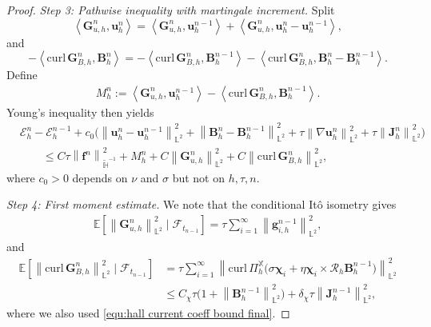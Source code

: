 \documentclass[11pt, reqno]{amsart}
\theoremstyle{definition}
\numberwithin{equation}{section}
\newcommand{\curl}{\mathrm{curl}\,}
\newcommand{\bff}{\boldsymbol}
\newcommand{\bb}{\mathbb}
\newcommand{\norm}[2]{\left\|{#1}\right\|_{#2}}
\newcommand{\inpro}[2]{\left\langle#1,#2\right\rangle}
\begin{document}
\begin{proof}
	\emph{Step 3: Pathwise inequality with martingale increment.}
	Split
	\[
	\inpro{\bff G_{u,h}^n}{\bff u_h^n}
	=
	\inpro{\bff G_{u,h}^n}{\bff u_h^{n-1}}
	+
	\inpro{\bff G_{u,h}^n}{\bff u_h^n-\bff u_h^{n-1}},
	\]
	and
	\[
	-\inpro{\curl\bff G_{B,h}^n}{\bff B_h^n}
	=
	-\inpro{\curl\bff G_{B,h}^n}{\bff B_h^{n-1}}
	-
	\inpro{\curl\bff G_{B,h}^n}{\bff B_h^n-\bff B_h^{n-1}}.
	\]
	Define
	\begin{align}\label{equ:mart increment revised}
		M_h^n
		:=
		\inpro{\bff G_{u,h}^n}{\bff u_h^{n-1}}
		-
		\inpro{\curl\bff G_{B,h}^n}{\bff B_h^{n-1}}.
	\end{align}
	Young's inequality then yields
	\begin{align}\label{equ:pathwise inequality revised}
		&\mathcal E_h^n-\mathcal E_h^{n-1}
		+
		c_0\Big(
		\norm{\bff u_h^n-\bff u_h^{n-1}}{\bb L^2}^2
		+
		\norm{\bff B_h^n-\bff B_h^{n-1}}{\bb L^2}^2
		+
		\tau\norm{\nabla\bff u_h^n}{\bb L^2}^2
		+
		\tau\norm{\bff J_h^n}{\bb L^2}^2
		\Big)
		\nonumber\\
		&\qquad
		\le
		C\tau\norm{\bff f^n}{\widetilde{\bb H}^{-1}}^2
		+
		M_h^n
		+
		C\norm{\bff G_{u,h}^n}{\bb L^2}^2
		+
		C\norm{\curl\bff G_{B,h}^n}{\bb L^2}^2,
	\end{align}
	where $c_0>0$ depends on $\nu$ and $\sigma$ but not on $h,\tau,n$.
	
	\emph{Step 4: First moment estimate.}
	We note that the conditional It\^o isometry gives
	\begin{align}\label{equ:cond Ito u revised}
		\bb E\left[
		\norm{\bff G_{u,h}^n}{\bb L^2}^2\mid\mathscr F_{t_{n-1}}
		\right]
		=
		\tau\sum_{i=1}^{\infty}\norm{\bff g_{i,h}^{n-1}}{\bb L^2}^2,
	\end{align}
	and
	\begin{align}\label{equ:cond Ito B revised}
		\bb E\left[
		\norm{\curl\bff G_{B,h}^n}{\bb L^2}^2\mid\mathscr F_{t_{n-1}}
		\right]
		&=
		\tau\sum_{i=1}^{\infty}
		\norm{
			\curl\Pi_h^{\bb X}\bigl(\sigma\bff\chi_i+\eta\bff\chi_i\times\mathcal R_h\bff B_h^{n-1}\bigr)
		}{\bb L^2}^2
		\nonumber\\
		&\le
		C_\chi \tau \bigl(1+\norm{\bff{B}_h^{n-1}}{\bb{L}^2}^2\bigr)+\delta_\chi \tau \norm{\bff{J}_h^{n-1}}{\bb{L}^2}^2,
	\end{align}
	where we also used \eqref{equ:hall current coeff bound final}.
	

\end{proof}
\end{document}
